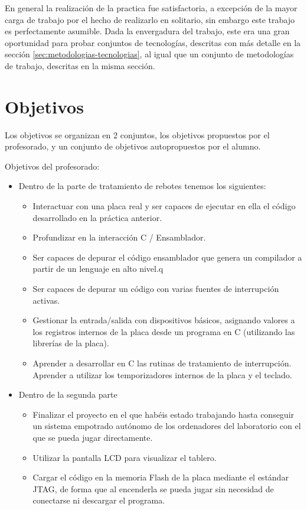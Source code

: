 \documentclass[12pt,letterpaper]{article}
\begin{document}
En general la realización de la practica fue satisfactoria, a
excepción de la mayor carga de trabajo por el hecho de realizarlo en
solitario, sin embargo este trabajo es perfectamente asumible. Dada la
envergadura del trabajo, este era una gran oportunidad para probar
conjuntos de tecnologías, descritas con más detalle en la sección
\ref{sec:metodologias-tecnologias}, al igual que un conjunto de
metodologías de trabajo, descritas en la misma sección.

\section{Objetivos}
\label{sec:objetivos}
Los objetivos se organizan en 2 conjuntos, los objetivos propuestos
por el profesorado, y un conjunto de objetivos autopropuestos por el
alumno.

Objetivos del profesorado:
\begin{itemize}
  \item Dentro de la parte de tratamiento de rebotes tenemos los siguientes:
    \begin{itemize}
      \item Interactuar con una placa real y ser capaces de ejecutar
        en ella el código desarrollado en la práctica anterior.
      \item Profundizar en la interacción C / Ensamblador.
      \item Ser capaces de depurar el código ensamblador que genera un
        compilador a partir de un lenguaje en alto nivel.q
      \item Ser capaces de depurar un código con varias fuentes de
        interrupción activas.
      \item Gestionar la entrada/salida con dispositivos básicos,
        asignando valores a los registros internos de la placa desde
        un programa en C (utilizando las librerías de la placa).
      \item Aprender a desarrollar en C las rutinas de tratamiento de
        interrupción. Aprender a utilizar los temporizadores internos
        de la placa y el teclado.
    \end{itemize}
  \item Dentro de la segunda parte
    \begin{itemize}
      \item Finalizar el proyecto en el que habéis estado trabajando
        hasta conseguir un sistema empotrado autónomo de los
        ordenadores del laboratorio con el que se pueda jugar
        directamente.
      \item Utilizar la pantalla LCD para visualizar el tablero.
      \item Cargar el código en la memoria Flash de la placa mediante
        el estándar JTAG, de forma que al encenderla se pueda jugar
        sin necesidad de conectarse ni descargar el programa.
    \end{itemize}
\end{itemize}
\end{document}
